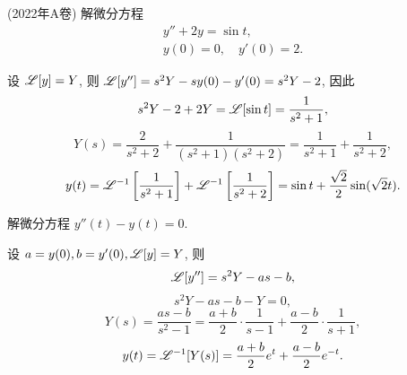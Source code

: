 \documentclass[nocolor,theme=doremi,lang=cn,11pt,chinese,twoside,openright,usesamecnt]{elegantbook}
\begin{document}
\begin{example}
	(2022年A卷) 解微分方程
	\begin{align*}
		y''+2y=\sin t,\\
		y(0)=0,\quad y'(0)=2.
	\end{align*}
\end{example}
\begin{solution}
	设 $\mathscr{L}[y]=Y$, 则 $\mathscr{L}[y'']=s^2Y-sy(0)-y'(0)=s^2Y-2$, 因此
		\[s^2Y-2+2Y=\mathscr{L}[\sin t]=\frac{1}{s^2+1},\]
		\[Y(s)=\frac{2}{s^2+2}+\frac{1}{(s^2+1)(s^2+2)}=\frac{1}{s^2+1}+\frac{1}{s^2+2},\]
		\[y(t)=\mathscr{L}^{-1}\left[\frac{1}{s^2+1}\right]+\mathscr{L}^{-1}\left[\frac{1}{s^2+2}\right]
		=\sin t+\frac{\sqrt 2}2\sin(\sqrt 2 t). \]
\end{solution}

\begin{example}
	解微分方程 $y''(t)-y(t)=0$.
\end{example}
\begin{solution}
	设 $a=y(0),b=y'(0),\mathscr{L}[y]=Y$, 则
		\[\mathscr{L}[y'']=s^2Y-as-b,\]
		\[s^2Y-as-b-Y=0,\]
		\[Y(s)=\frac{as-b}{s^2-1}=\frac{a+b}2\cdot\frac1{s-1}+\frac{a-b}2\cdot\frac1{s+1},\]
		\[y(t)=\mathscr{L}^{-1}[Y(s)]=\frac{a+b}2e^t+\frac{a-b}2e^{-t}.\]
\end{solution}
\end{document}
